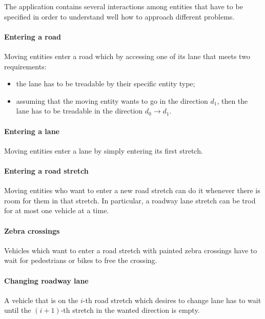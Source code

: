 
The application contains several interactions among entities that have to be
specified in order to understand well how to approach different problems.

\paragraph{Entering a road} Moving entities enter a road which by accessing
one of its lane that meets two requirements:

\begin{itemize}
  \item the lane has to be treadable by their specific entity type;
  \item assuming that the moving entity wants to go in the direction $d_1$,
    then the lane has to be treadable in the direction $d_0 \rightarrow d_1$.
\end{itemize}

\paragraph{Entering a lane}
Moving entities enter a lane by simply entering its first stretch.

\paragraph{Entering a road stretch}
Moving entities who want to enter a new road stretch can do it whenever there
is room for them in that stretch.
In particular, a roadway lane stretch can be trod for at most one vehicle at a
time.

\paragraph{Zebra crossings}
Vehicles which want to enter a road stretch with painted zebra crossings have
to wait for pedestrians or bikes to free the crossing.

\paragraph{Changing roadway lane} A vehicle that is on the $i$-th road stretch
which desires to change lane has to wait until the $(i+1)$-th stretch in the
wanted direction is empty.

